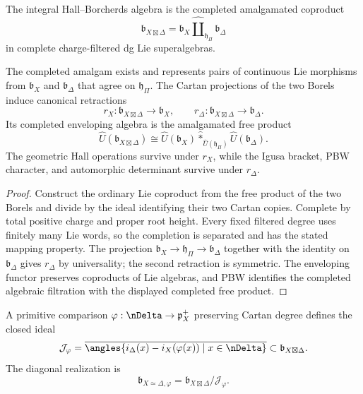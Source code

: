 \begin{definition}
The integral Hall--Borcherds algebra is the completed amalgamated coproduct
\[
 \mathfrak b_{X\boxtimes\Delta}
 =\mathfrak b_X
  \widehat\amalg_{\mathfrak h_\Pi}
  \mathfrak b_\Delta
\]
in complete charge-filtered dg Lie superalgebras.
\end{definition}

\begin{theorem}
The completed amalgam exists and represents pairs of continuous Lie morphisms from $\mathfrak b_X$ and $\mathfrak b_\Delta$ that agree on $\mathfrak h_\Pi$.  The Cartan projections of the two Borels induce canonical retractions
\[
 r_X:\mathfrak b_{X\boxtimes\Delta}\longrightarrow\mathfrak b_X,
 \qquad
 r_\Delta:\mathfrak b_{X\boxtimes\Delta}\longrightarrow\mathfrak b_\Delta.
\]
Its completed enveloping algebra is the amalgamated free product
\[
 \widehat U(\mathfrak b_{X\boxtimes\Delta})
 \cong
 \widehat U(\mathfrak b_X)
 \widehat *_{\widehat U(\mathfrak h_\Pi)}
 \widehat U(\mathfrak b_\Delta).
\]
The geometric Hall operations survive under $r_X$, while the Igusa bracket, PBW character, and automorphic determinant survive under $r_\Delta$.
\end{theorem}
\begin{proof}
Construct the ordinary Lie coproduct from the free product of the two Borels and divide by the ideal identifying their two Cartan copies.  Complete by total positive charge and proper root height.  Every fixed filtered degree uses finitely many Lie words, so the completion is separated and has the stated mapping property.  The projection $\mathfrak b_X\to\mathfrak h_\Pi\to\mathfrak b_\Delta$ together with the identity on $\mathfrak b_\Delta$ gives $r_\Delta$ by universality; the second retraction is symmetric.  The enveloping functor preserves coproducts of Lie algebras, and PBW identifies the completed algebraic filtration with the displayed completed free product.
\end{proof}

\begin{definition}
A primitive comparison $\varphi:\nDelta\to\mathfrak p_X^+$ preserving Cartan degree defines the closed ideal
\[
 \mathcal J_\varphi
 =\overline{\angles{
   i_\Delta(x)-i_X(\varphi(x))\mid x\in\nDelta
 }}
 \subset\mathfrak b_{X\boxtimes\Delta}.
\]
The diagonal realization is
\[
 \mathfrak b_{X\simeq\Delta,\varphi}
 =\mathfrak b_{X\boxtimes\Delta}/\mathcal J_\varphi.
\]
\end{definition}

